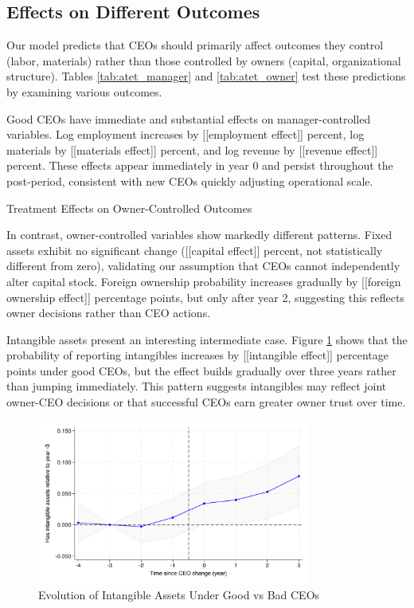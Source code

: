 \documentclass[11pt,a4paper]{article}
\begin{document}
\subsection{Effects on Different Outcomes}

Our model predicts that CEOs should primarily affect outcomes they control (labor, materials) rather than those controlled by owners (capital, organizational structure). Tables \ref{tab:atet_manager} and \ref{tab:atet_owner} test these predictions by examining various outcomes.

Good CEOs have immediate and substantial effects on manager-controlled variables. Log employment increases by [[employment effect]] percent, log materials by [[materials effect]] percent, and log revenue by [[revenue effect]] percent. These effects appear immediately in year 0 and persist throughout the post-period, consistent with new CEOs quickly adjusting operational scale.

\begin{table}[htbp]
\centering
\caption{Treatment Effects on Owner-Controlled Outcomes}
\label{tab:atet_owner}

\end{table}

In contrast, owner-controlled variables show markedly different patterns. Fixed assets exhibit no significant change ([[capital effect]] percent, not statistically different from zero), validating our assumption that CEOs cannot independently alter capital stock. Foreign ownership probability increases gradually by [[foreign ownership effect]] percentage points, but only after year 2, suggesting this reflects owner decisions rather than CEO actions.

Intangible assets present an interesting intermediate case. Figure \ref{fig:intangibles} shows that the probability of reporting intangibles increases by [[intangible effect]] percentage points under good CEOs, but the effect builds gradually over three years rather than jumping immediately. This pattern suggests intangibles may reflect joint owner-CEO decisions or that successful CEOs earn greater owner trust over time.

\begin{figure}[htbp]
\centering
\includegraphics[width=0.8\textwidth]{figure/event_study_has_intangible.pdf}
\caption{Evolution of Intangible Assets Under Good vs Bad CEOs}
\label{fig:intangibles}
\end{figure}
\end{document}

